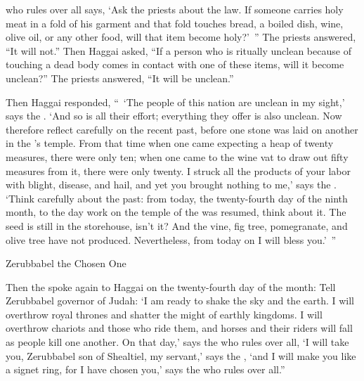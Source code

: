 {{}
who rules over all
says, ‘Ask
the priests
about the law.
If
someone
carries
holy
meat
in a fold
of his garment
and that fold
touches
bread,
a boiled dish,
wine,
olive oil,
or any
other food,
will that item become holy?’ ” The priests
answered,
“It will not.”
Then Haggai
asked, “If
a person who
is ritually unclean
because of touching
a dead body comes in contact
with one
of these
items, will it become unclean?” The priests
answered,
“It will be unclean.”
\par }{\PP {}Then
Haggai
responded,
“ ‘The people
of this
nation
are unclean in my sight,’
says
the {}. ‘And so
is all
their effort;
everything
they offer
is also
unclean.
Now
therefore reflect carefully
on
the recent
past,
before
one stone
was laid
on
another
in the
{}’s
temple.
From that time
when one came
expecting a heap
of twenty
measures, there were
only ten;
when one came
to
the wine vat
to draw out
fifty
measures from it,
there were
only twenty.
I struck
all
the products of your labor
with blight,
disease,
and hail,
and yet you brought
nothing
to
me,’ says
the {}.
‘Think
carefully
about the past: from
today,
the twenty-fourth
day
of the ninth
month, to the day
work
on
the temple
of the {}
was resumed,
think
about it.
The seed
is still
in the storehouse,
isn’t
it? And the vine,
fig tree,
pomegranate,
and olive
tree
have not
produced. Nevertheless,
from
today
on I will bless you.’ ”
\par }{\SH Zerubbabel the Chosen One
\par }{\PP {}Then
the {}
spoke
again
to
Haggai
on the twenty-fourth
day of the month:
Tell
Zerubbabel
governor
of Judah: ‘I am
ready to shake
the sky
and the earth.
I will overthrow
royal
thrones
and shatter
the might of earthly
kingdoms.
I will overthrow
chariots
and those
who ride
them, and horses
and their riders
will
fall as people
kill
one
another.
On that day,’
says
the {}
who rules over all,
‘I will take
you, Zerubbabel
son
of Shealtiel,
my servant,’
says
the {}, ‘and I will make
you like a signet
ring, for
I have chosen
you,’ says
the {}
who rules over all.”
\par }